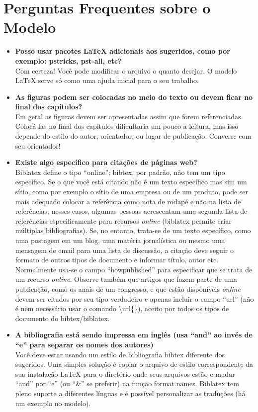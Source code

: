 \section{Perguntas Frequentes sobre o Modelo}

\begin{itemize}

\item \textbf{Posso usar pacotes \LaTeX{} adicionais aos sugeridos, como por exemplo: pstricks, pst-all, etc?}\\
Com certeza! Você pode modificar o arquivo o quanto desejar. O modelo \LaTeX{} serve só como uma ajuda inicial para o seu trabalho.

\item \textbf{As figuras podem ser colocadas no meio do texto ou devem ficar no final dos capítulos?}\\
Em geral as figuras devem ser apresentadas assim que forem referenciadas. Colocá-las no final dos capítulos dificultaria um pouco a leitura, mas isso depende do estilo do autor, orientador, ou lugar de publicação. Converse com seu orientador!

\item \textbf{Existe algo específico para citações de páginas web?}\\
Biblatex define o tipo ``online''; bibtex, por padrão, não tem um tipo específico. Se o que você está citando não é um texto específico mas sim um sítio, como por exemplo o sítio de uma empresa ou de um produto, pode ser mais adequado colocar a referência como nota de rodapé e não na lista de referências; nesses casos, algumas pessoas acrescentam uma segunda lista de referências especificamente para recursos \emph{online} (biblatex  permite criar múltiplas bibliografias). Se, no entanto, trata-se de um texto específico, como uma postagem em um blog, uma matéria jornalística ou mesmo uma mensagem de email para uma lista de discussão, a citação deve seguir o formato de outros tipos de documento e informar título, autor etc. Normalmente usa-se o campo ``howpublished'' para especificar que se trata de um recurso \emph{online}. Observe também que artigos que fazem parte de uma publicação, como os anais de um congresso, e que estão disponíveis \emph{online} devem ser citados por seu tipo verdadeiro e apenas incluir o campo ``url'' (não é nem necessário usar o comando \textsf{\textbackslash{}url\{\}}), aceito por todos os tipos de documento do bibtex/biblatex.

\item \textbf{A bibliografia está sendo impressa em inglês (usa ``and'' ao invés de ``e'' para separar os nomes dos autores)}\\
Você deve estar usando um estilo de bibliografia bibtex diferente dos sugeridos. Uma simples solução é copiar o arquivo de estilo correspondente da sua instalação \LaTeX{} para o diretório onde seus arquivos estão e mudar ``and'' por ``e'' (ou ``\&'' se preferir) na função format.names. Biblatex tem pleno suporte a diferentes línguas e é possível personalizar as traduções (há um exemplo no modelo).


\end{itemize}
